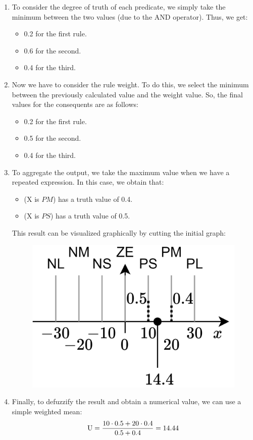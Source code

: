 \begin{example}
\begin{enumerate}
\begin{itemize}
            \end{itemize}
        \item To consider the degree of truth of each predicate, we simply take the minimum between the two values (due to the AND operator). 
            Thus, we get: 
            \begin{itemize}
                \item 0.2 for the first rule. 
                \item 0.6 for the second. 
                \item 0.4 for the third.
            \end{itemize}
        \item Now we have to consider the rule weight. 
            To do this, we select the minimum between the previously calculated value and the weight value. 
            So, the final values for the consequents are as follows:
            \begin{itemize}
                \item 0.2 for the first rule. 
                \item 0.5 for the second. 
                \item 0.4 for the third.
            \end{itemize}
        \item To aggregate the output, we take the maximum value when we have a repeated expression. 
            In this case, we obtain that: 
            \begin{itemize}
                \item (X is $PM$) has a truth value of 0.4.
                \item (X is $PS$) has a truth value of 0.5.
            \end{itemize}
            This result can be visualized graphically by cutting the initial graph: 
            \begin{figure}[H]
                \centering
                \includegraphics[width=0.3\linewidth]{images/cut.png}
            \end{figure}
        \item Finally, to defuzzify the result and obtain a numerical value, we can use a simple weighted mean:
            \[\textnormal{U}=\dfrac{10 \cdot 0.5 + 20 \cdot 0.4}{0.5+0.4}=14.44\]
    \end{enumerate}


\end{example}
